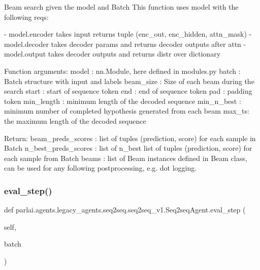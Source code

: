 \begin{DoxyVerb}Beam search given the model and Batch This function uses model with the
following reqs:

- model.encoder takes input returns tuple (enc_out, enc_hidden, attn_mask)
- model.decoder takes decoder params and returns decoder outputs after attn
- model.output takes decoder outputs and returns distr over dictionary

Function arguments:
model : nn.Module, here defined in modules.py
batch : Batch structure with input and labels
beam_size : Size of each beam during the search
start : start of sequence token
end : end of sequence token
pad : padding token
min_length : minimum length of the decoded sequence
min_n_best : minimum number of completed hypothesis generated from each beam
max_ts: the maximum length of the decoded sequence

Return:
beam_preds_scores : list of tuples (prediction, score) for each sample in Batch
n_best_preds_scores : list of n_best list of tuples (prediction, score) for
              each sample from Batch
beams : list of Beam instances defined in Beam class, can be used for any
following postprocessing, e.g. dot logging.
\end{DoxyVerb}
 \mbox{\label{classparlai_1_1agents_1_1legacy__agents_1_1seq2seq_1_1seq2seq__v1_1_1Seq2seqAgent_ad06de7c94ee40c403f792e7b48e0b137}} 
\subsubsection{\texorpdfstring{eval\+\_\+step()}{eval\_step()}}
{\footnotesize\ttfamily def parlai.\+agents.\+legacy\+\_\+agents.\+seq2seq.\+seq2seq\+\_\+v1.\+Seq2seq\+Agent.\+eval\+\_\+step (\begin{DoxyParamCaption}\item[{}]{self,  }\item[{}]{batch }\end{DoxyParamCaption})}

